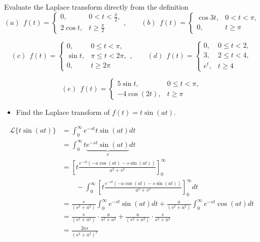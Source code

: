 \documentclass[11pt]{beamer}
\theoremstyle{plain}
\begin{document}
\begin{frame}
    \begin{example}
Evaluate the Laplace transform directly from the definition
\[
(a)\:\:f(t)=
\begin{cases}
0, & 0<t<\frac{\pi}{2},\\
2\cos t, & t \ge \frac{\pi}{2}
\end{cases},\qquad
(b)\:\:f(t)=
\begin{cases}
\cos 3t, & 0<t<\pi,\\
0, & t \ge \pi
\end{cases}
\]

\[
(c)\:\:f(t)=
\begin{cases}
0, & 0 \le t < \pi,\\
\sin t, & \pi \le t < 2\pi,\\
0, & t \ge 2\pi
\end{cases},\qquad
(d)\:\:f(t)=
\begin{cases}
0, & 0 \le t < 2,\\
3, & 2 \le t < 4,\\
e^t, & t \ge 4
\end{cases}
\]

\[
(e)\:\:f(t)=
\begin{cases}
5\sin t, & 0 \le t < \pi,\\
-4\cos(2t), & t \ge \pi
\end{cases}
\]
\end{example}
\end{frame}

\begin{frame}
    \begin{example}
        \begin{itemize}
            \item Find the Laplace transform of $f(t)=t\sin(at)$.
        \end{itemize}
    \end{example}
        \pause
            \begin{align*}
                \mathcal L\{t\sin(at)\} &= \int_0^\infty e^{-st}t\sin(at)dt \\
                &= \int_0^\infty t \underbrace{e^{-st} \sin(at)}_{v} dt\\
                &= \left[ t \frac{e^{-st}(-a\cos(at)-s\sin(at))}{a^2+s^2} \right]_0^\infty \\
                & \qquad - \int_0^\infty \left[ t \frac{e^{-st}(-a\cos(at)-s\sin(at))}{a^2+s^2} \right]_0^\infty dt\\
                &= \frac{s}{(s^2+a^2)} \int_0^\infty e^{-st}\sin(at)dt + \frac{a}{(s^2+a^2)} \int_0^\infty e^{-st}\cos(at)dt \\
                &= \frac{s}{(s^2+a^2)} \cdot \frac{a}{s^2+a^2} + \frac{a}{(s^2+a^2)} \cdot \frac{s}{s^2+a^2} \\
                &= \frac{2as}{(s^2+a^2)^2}
            \end{align*}
\end{frame}
\end{document}
